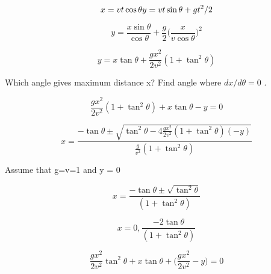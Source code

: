 \documentclass{article}
\begin{document}
$$x = vt \cos\theta \\
y = vt \sin\theta + g t^2 / 2 \\

$$

$$y = \frac {x \sin\theta } {\cos\theta } + \frac{g}{2}\bigg(\frac{x}{v\cos\theta}\bigg)^2$$

$$y = x \tan\theta + \frac{gx^2}{2v^2} (1+\tan^2\theta) $$

Which angle gives maximum distance x? Find angle where $dx/d\theta = 0$ .  

$$\frac{gx^2}{2v^2} (1+\tan^2\theta) + x \tan\theta -y = 0$$

$$x = \frac{ -\tan\theta \pm \sqrt{\tan^2\theta - 4\frac{gx^2}{2v^2}(1+\tan^2\theta)(-y) } } { \frac{g}{v^2} (1+\tan^2\theta) }$$

Assume that g=v=1 and y = 0

$$x = \frac{ -\tan\theta \pm \sqrt{\tan^2\theta} } { (1+\tan^2\theta) }$$

$$x = 0, \frac{ -2\tan\theta } { (1+\tan^2\theta) }$$

$$\frac{gx^2}{2v^2} \tan^2\theta + x \tan\theta  + \bigg(\frac{gx^2}{2v^2} -y \bigg) = 0$$
\end{document}
